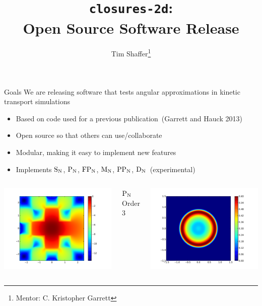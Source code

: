 \documentclass{beamer}
\title{\texttt{closures-2d}:\\Open Source Software Release}
\author{Tim Shaffer\thanks{Mentor: C. Kristopher Garrett}}
\newcommand{\SN}{\ensuremath{\textnormal{S}_\textnormal{N}}\xspace}
\newcommand{\PN}{\ensuremath{\textnormal{P}_\textnormal{N}}\xspace}
\newcommand{\MN}{\ensuremath{\textnormal{M}_\textnormal{N}}\xspace}
\newcommand{\PPN}{\ensuremath{\textnormal{PP}_\textnormal{N}}\xspace}
\newcommand{\FPN}{\ensuremath{\textnormal{FP}_\textnormal{N}}\xspace}
\newcommand{\DN}{\ensuremath{\textnormal{D}_\textnormal{N}}\xspace}
\begin{document}
    \frame{\titlepage}

    \begin{frame}{Goals}
        We are releasing software that tests angular approximations in kinetic transport simulations
        \begin{itemize}
            \item Based on code used for a previous publication~(Garrett and Hauck 2013)
            \item Open source so that others can use/collaborate
            \item Modular, making it easy to implement new features
            \item Implements \SN, \PN, \FPN, \MN, \PPN, \DN~(experimental)
        \end{itemize}

        \vfill

        \begin{columns}
            \centering
            \includegraphics[width=\textwidth]{lattice.pdf}

            \PN Order 3

            \centering
            \includegraphics[width=\textwidth]{FP03-sspline-400-tune=20.pdf}


\end{columns}
\end{frame}
\end{document}
